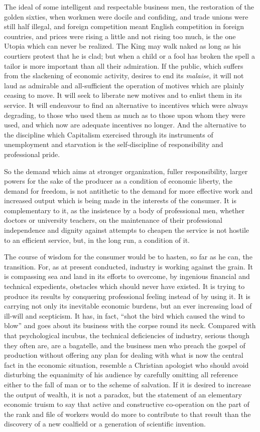 \documentclass{book}
\begin{document}
The ideal of some intelligent and respectable business men, the restoration of the golden sixties, when workmen were docile and confiding, and trade unions were still half illegal, and foreign competition meant English competition in foreign countries, and prices were rising a little and not rising too much, is the one Utopia which can never be realized. The King may walk naked as long as his courtiers protest that he is clad; but when a child or a fool has broken the spell a tailor is more important than all their admiration. If the public, which suffers from the slackening of economic activity, desires to end its \emph{malaise}, it will not laud as admirable and all-sufficient the operation of motives which are plainly ceasing to move. It will seek to liberate new motives and to enlist them in its service. It will endeavour to find an alternative to incentives which were always degrading, to those who used them as much as to those upon whom they were used, and which now are adequate incentives no longer. And the alternative to the discipline which Capitalism exercised through its instruments of unemployment and starvation is the self-discipline of responsibility and professional pride.

So the demand which aims at stronger organization, fuller responsibility, larger powers for the sake of the producer as a condition of economic liberty, the demand for freedom, is not antithetic to the demand for more effective work and increased output which is being made in the interests of the consumer. It is complementary to it, as the insistence by a body of professional men, whether doctors or university teachers, on the maintenance of their professional independence and dignity against attempts to cheapen the service is not hostile to an efficient service, but, in the long run, a condition of it.

The course of wisdom for the consumer would be to hasten, so far as he can, the transition. For, as at present conducted, industry is working against the grain. It is compassing sea and land in its efforts to overcome, by ingenious financial and technical expedients, obstacles which should never have existed. It is trying to produce its results by conquering professional feeling instead of by using it. It is carrying not only its inevitable economic burdens, but an ever increasing load of ill-will and scepticism. It has, in fact, “shot the bird which caused the wind to blow” and goes about its business with the corpse round its neck. Compared with that psychological incubus, the technical deficiencies of industry, serious though they often are, are a bagatelle, and the business men who preach the gospel of production without offering any plan for dealing with what is now the central fact in the economic situation, resemble a Christian apologist who should avoid disturbing the equanimity of his audience by carefully omitting all reference either to the fall of man or to the scheme of salvation. If it is desired to increase the output of wealth, it is not a paradox, but the statement of an elementary economic truism to say that active and constructive co-operation on the part of the rank and file of workers would do more to contribute to that result than the discovery of a new coalfield or a generation of scientific invention.
\end{document}
